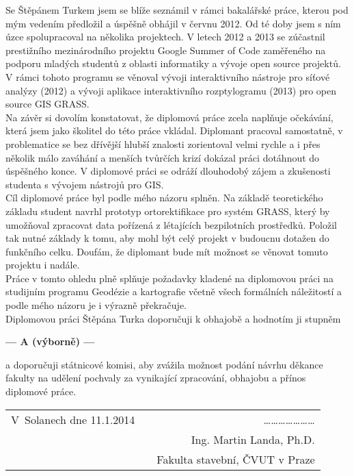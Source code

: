 \documentclass[czech,11pt,a4paper]{article}
\begin{document}
Se Štěpánem Turkem jsem se blíže seznámil v rámci bakalářské práce,
kterou pod mým vedením předložil a úspěšně obhájil v červnu 2012. Od
té doby jsem s ním úzce spolupracoval na několika projektech. V letech
2012 a 2013 se zúčastnil prestižního mezinárodního projektu Google
Summer of Code zaměřeného na podporu mladých studentů z oblasti
informatiky a vývoje open source projektů. V rámci tohoto programu se
věnoval vývoji interaktivního nástroje pro síťové analýzy (2012) a
vývoji aplikace interaktivního rozptylogramu (2013) pro open source
GIS GRASS.
\\

Na závěr si dovolím konstatovat, že diplomová práce zcela naplňuje
očekávání, která jsem jako školitel do této práce vkládal. Diplomant
pracoval samostatně, v problematice se bez dřívější hlubší znalosti
zorientoval velmi rychle a i přes několik málo zaváhání a menších
tvůrčích krizí dokázal práci dotáhnout do úspěšného konce. V diplomové
práci se odráží dlouhodobý zájem a zkušenosti studenta s vývojem
nástrojů pro GIS.
\\

Cíl diplomové práce byl podle mého názoru splněn. Na základě
teoretického základu student navrhl prototyp ortorektifikace pro
systém GRASS, který by umožňoval zpracovat data pořízená z létajících
bezpilotních prostředků. Položil tak nutné základy k tomu, aby mohl
být celý projekt v budoucnu dotažen do funkčního celku. Doufám, že
diplomant bude mít možnost se věnovat tomuto projektu i nadále.
\\

Práce v tomto ohledu plně splňuje požadavky kladené na diplomovou
práci na studijním programu Geodézie a kartografie včetně všech
formálních náležitostí a podle mého názoru je i výrazně překračuje.
\\

Diplomovou práci Štěpána Turka doporučuji k obhajobě a hodnotím ji
stupněm

\begin{center}
{\bf --- A (výborně)  ---}
\end{center}

a doporučuji státnicové komisi, aby zvážila možnost podání návrhu
děkance fakulty na udělení pochvaly za vynikající zpracování, obhajobu
a přínos diplomové práce.

\vspace{2cm}

\noindent \begin{tabular}{lp{}r}
V~Solanech dne 11.1.2014 & & \ldots\ldots\ldots\ldots\ldots\ldots\ldots \\
& & Ing. Martin Landa, Ph.D. \\
& & Fakulta stavební, ČVUT v Praze \\
\end{tabular}
\end{document}
